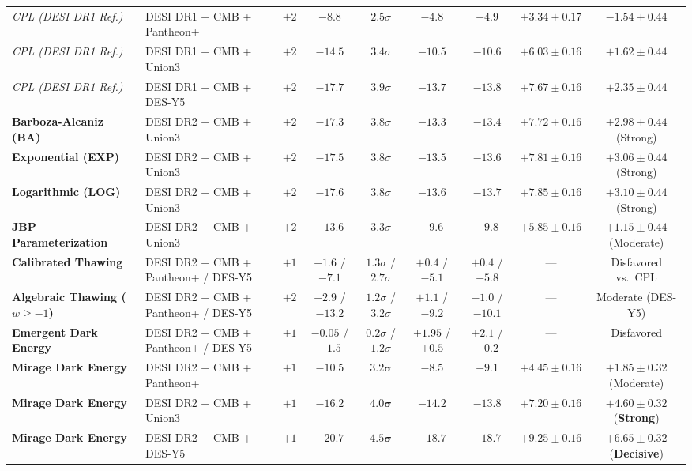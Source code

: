 \documentclass[11pt,letterpaper]{article}
\begin{document}
\begin{table}[!htbp]
{\begin{tabular}{llccccccc}
\midrule
\emph{CPL (DESI DR1 Ref.)} & DESI DR1 + CMB + Pantheon+ & $+2$ & $-8.8$ & $2.5\sigma$ & $-4.8$ & $-4.9$ & $+3.34 \pm 0.17$ & $-1.54 \pm 0.44$ \\
\emph{CPL (DESI DR1 Ref.)} & DESI DR1 + CMB + Union3 & $+2$ & $-14.5$ & $3.4\sigma$ & $-10.5$ & $-10.6$ & $+6.03 \pm 0.16$ & $+1.62 \pm 0.44$ \\
\emph{CPL (DESI DR1 Ref.)} & DESI DR1 + CMB + DES-Y5 & $+2$ & $-17.7$ & $3.9\sigma$ & $-13.7$ & $-13.8$ & $+7.67 \pm 0.16$ & $+2.35 \pm 0.44$ \\
\midrule
\textbf{Barboza-Alcaniz (BA)} & DESI DR2 + CMB + Union3 & $+2$ & $-17.3$ & $3.8\sigma$ & $-13.3$ & $-13.4$ & $+7.72 \pm 0.16$ & $+2.98 \pm 0.44$ (Strong) \\
\textbf{Exponential (EXP)} & DESI DR2 + CMB + Union3 & $+2$ & $-17.5$ & $3.8\sigma$ & $-13.5$ & $-13.6$ & $+7.81 \pm 0.16$ & $+3.06 \pm 0.44$ (Strong) \\
\textbf{Logarithmic (LOG)} & DESI DR2 + CMB + Union3 & $+2$ & $-17.6$ & $3.8\sigma$ & $-13.6$ & $-13.7$ & $+7.85 \pm 0.16$ & $+3.10 \pm 0.44$ (Strong) \\
\textbf{JBP Parameterization} & DESI DR2 + CMB + Union3 & $+2$ & $-13.6$ & $3.3\sigma$ & $-9.6$ & $-9.8$ & $+5.85 \pm 0.16$ & $+1.15 \pm 0.44$ (Moderate) \\
\midrule
\textbf{Calibrated Thawing} & DESI DR2 + CMB + Pantheon+ / DES-Y5 & $+1$ & $-1.6$ / $-7.1$ & $1.3\sigma$ / $2.7\sigma$ & $+0.4$ / $-5.1$ & $+0.4$ / $-5.8$ & --- & Disfavored vs.\ CPL \\
\textbf{Algebraic Thawing ($w\ge -1$)} & DESI DR2 + CMB + Pantheon+ / DES-Y5 & $+2$ & $-2.9$ / $-13.2$ & $1.2\sigma$ / $3.2\sigma$ & $+1.1$ / $-9.2$ & $-1.0$ / $-10.1$ & --- & Moderate (DES-Y5) \\
\textbf{Emergent Dark Energy} & DESI DR2 + CMB + Pantheon+ / DES-Y5 & $+1$ & $-0.05$ / $-1.5$ & $0.2\sigma$ / $1.2\sigma$ & $+1.95$ / $+0.5$ & $+2.1$ / $+0.2$ & --- & Disfavored \\
\textbf{Mirage Dark Energy} & DESI DR2 + CMB + Pantheon+ & $+1$ & $-10.5$ & $\mathbf{3.2}\boldsymbol{\sigma}$ & $-8.5$ & $-9.1$ & $+4.45 \pm 0.16$ & $\mathbf{+1.85 \pm 0.32}$ (Moderate) \\
\textbf{Mirage Dark Energy} & DESI DR2 + CMB + Union3 & $+1$ & $-16.2$ & $\mathbf{4.0}\boldsymbol{\sigma}$ & $-14.2$ & $-13.8$ & $+7.20 \pm 0.16$ & $\mathbf{+4.60 \pm 0.32}$ (\textbf{Strong}) \\
\textbf{Mirage Dark Energy} & DESI DR2 + CMB + DES-Y5 & $+1$ & $-20.7$ & $\mathbf{4.5}\boldsymbol{\sigma}$ & $-18.7$ & $-18.7$ & $+9.25 \pm 0.16$ & $\mathbf{+6.65 \pm 0.32}$ (\textbf{Decisive}) \\
\bottomrule
\end{tabular}%
}
\end{table}
\end{document}
